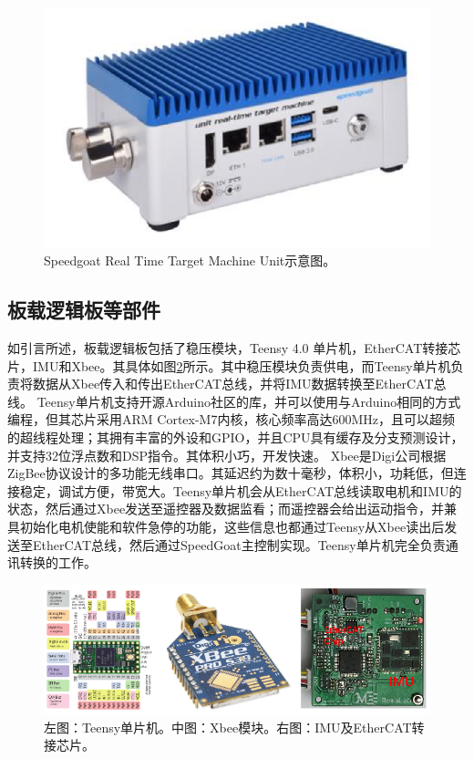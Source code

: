 \begin{figure}
  \centering
  \includegraphics[width=0.6\linewidth]{figures/Sec3/speedgoat.png}
  \caption{
  Speedgoat Real Time Target Machine Unit示意图。
  }
  \label{fig:sec3-speedgoat}
   \vspace{6pt}
\end{figure}

\subsection{板载逻辑板等部件}
如引言所述，板载逻辑板包括了稳压模块，Teensy 4.0 单片机，EtherCAT转接芯片，IMU和Xbee。其具体如图\ref{fig:sec3-logicbd}所示。其中稳压模块负责供电，而Teensy单片机负责将数据从Xbee传入和传出EtherCAT总线，并将IMU数据转换至EtherCAT总线。
Teensy单片机支持开源Arduino社区的库，并可以使用与Arduino相同的方式编程，但其芯片采用ARM Cortex-M7内核，核心频率高达600MHz，且可以超频的超线程处理；其拥有丰富的外设和GPIO，并且CPU具有缓存及分支预测设计，并支持32位浮点数和DSP指令。其体积小巧，开发快速。
Xbee是Digi公司根据ZigBee协议设计的多功能无线串口。其延迟约为数十毫秒，体积小，功耗低，但连接稳定，调试方便，带宽大。Teensy单片机会从EtherCAT总线读取电机和IMU的状态，然后通过Xbee发送至遥控器及数据监看；而遥控器会给出运动指令，并兼具初始化电机使能和软件急停的功能，这些信息也都通过Teensy从Xbee读出后发送至EtherCAT总线，然后通过SpeedGoat主控制实现。Teensy单片机完全负责通讯转换的工作。

\begin{figure}
  \centering
  \includegraphics[width=0.85\linewidth]{figures/Sec3/logicbd.png}
  \caption{
  左图：Teensy单片机。中图：Xbee模块。右图：IMU及EtherCAT转接芯片。
  }
  \label{fig:sec3-logicbd}
   \vspace{6pt}
\end{figure}

